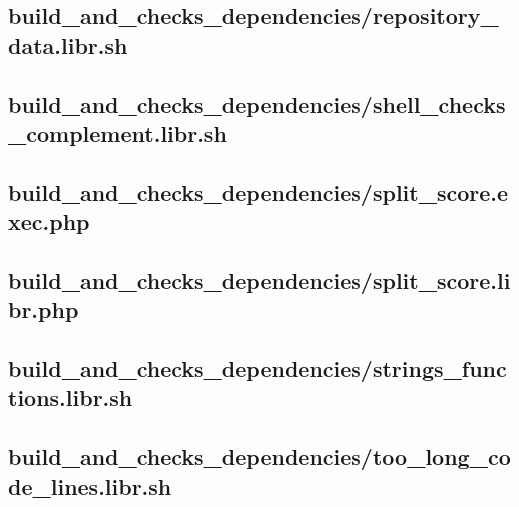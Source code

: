 \documentclass{article}
\begin{document}
\subsection{
  build\_and\_checks\_dependencies/repository\_data.libr.sh
}
\label{
  build_and_checks_dependencies:repository_datalibrsh
}



\subsection{
  build\_and\_checks\_dependencies/shell\_checks\_complement.libr.sh
}
\label{
  build_and_checks_dependencies:shell_checks_complementlibrsh
}



\subsection{
  build\_and\_checks\_dependencies/split\_score.exec.php
}
\label{
  build_and_checks_dependencies:split_scoreexecphp
}



\subsection{
  build\_and\_checks\_dependencies/split\_score.libr.php
}
\label{
  build_and_checks_dependencies:split_scorelibrphp
}



\subsection{
  build\_and\_checks\_dependencies/strings\_functions.libr.sh
}
\label{
  build_and_checks_dependencies:strings_functionslibrsh
}



\subsection{
  build\_and\_checks\_dependencies/too\_long\_code\_lines.libr.sh
}
\label{
  build_and_checks_dependencies:too_long_code_lineslibrsh
}
\end{document}
